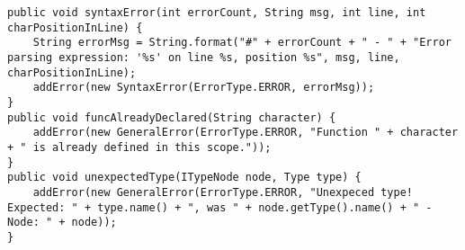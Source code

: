 \begin{lstlisting}[caption={three different error messages from the ErrorHandler class}, label={eh04}]
public void syntaxError(int errorCount, String msg, int line, int charPositionInLine) {
    String errorMsg = String.format("#" + errorCount + " - " + "Error parsing expression: '%s' on line %s, position %s", msg, line, charPositionInLine);
    addError(new SyntaxError(ErrorType.ERROR, errorMsg));
}
public void funcAlreadyDeclared(String character) {
    addError(new GeneralError(ErrorType.ERROR, "Function " + character + " is already defined in this scope."));
}
public void unexpectedType(ITypeNode node, Type type) {
    addError(new GeneralError(ErrorType.ERROR, "Unexpeced type! Expected: " + type.name() + ", was " + node.getType().name() + " - Node: " + node));
}
\end{lstlisting}
